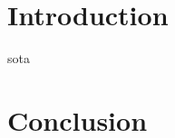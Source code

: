 \documentclass[12pt]{report}
\begin{document}
\setlength{\parskip}{1em}
\renewcommand{\baselinestretch}{2.0}

\newpage
{}
\setcounter{page}{1}

\chapter*{Introduction}
{sota}

\chapter*{Conclusion}

% 	
\end{document}
